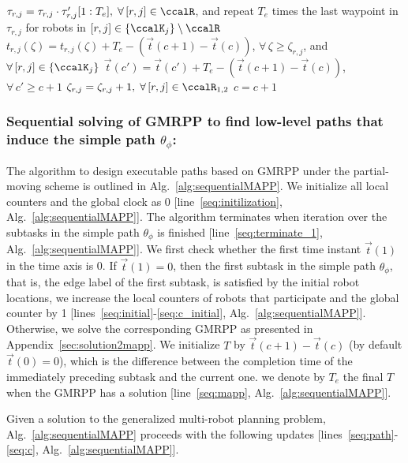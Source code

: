 \documentclass[Afour,sageh,times]{sagej}
\begin{document}
{{{\begin{algorithm}[!t]
{{            $\tau_{r,j} = \tau_{r,j} \cdot \tau'_{r,j}[1:T_e], \;\forall \,[r,j] \in \ccalR $, and repeat  $T_e$ times  the last waypoint in $\tau_{r,j}$ for robots in $[r,j] \in \{\ccalK_j\} \setminus \ccalR$ \label{seq:path}\;
            $t_{r,j}(\zeta) =  t_{r,j}(\zeta)  + T_e - (\vec{t}(c+1) - \vec{t}(c))$, $\forall \,\zeta \geq  \zeta_{r,j}$, and $ \forall\, [r,j] \in \{\ccalK_j\} $ \label{seq:timeline} \;
            $\vec{t}(c') = \vec{t}(c') + T_e - (\vec{t}(c+1) - \vec{t}(c))$, $ \forall \, c' \geq c+1$  \label{seq:axis}\;
            $\zeta_{r,j} = \zeta_{r,j} + 1, \; \forall \, [r,j] \in \ccalR_{1,2}$ \label{seq:counter}\;
            $c = c + 1$ \label{seq:c}\;

        }
      }
\end{algorithm}}

 \subsubsection{Sequential solving of  GMRPP to find low-level paths that induce the simple path $\theta_{\phi}$:}
 The algorithm to design executable paths based on GMRPP under the  partial-moving scheme is outlined in Alg.~\ref{alg:sequentialMAPP}.  We initialize all local counters and the global clock as 0 [line~\ref{seq:initilization}, Alg.~\ref{alg:sequentialMAPP}]. The algorithm  terminates when iteration over  the subtasks in the simple path $\theta_{\phi}$ is finished [line~\ref{seq:terminate_1}, Alg.~\ref{alg:sequentialMAPP}].  We first check whether the first time instant $\vec{t}(1)$ in the time axis is 0. If $\vec{t}(1)=0$, then the first subtask in the simple path $\theta_{\phi}$, that is, the edge label of the first subtask, is satisfied by the initial robot locations, we increase the local counters of robots that participate and the global counter by 1 [lines~\ref{seq:initial}-\ref{seq:c_initial}, Alg.~\ref{alg:sequentialMAPP}]. Otherwise, we solve the corresponding GMRPP as presented in Appendix~\ref{sec:solution2mapp}.  We initialize $T$ by $\vec{t}(c+1) - \vec{t}(c)$ (by default $\vec{t}(0)=0$),  which is the difference between the completion time of the immediately preceding subtask and the current one. %
we denote by $T_e$  the final $T$  when  the GMRPP has a solution [line~\ref{seq:mapp}, Alg.~\ref{alg:sequentialMAPP}]. {Given a solution to the generalized multi-robot planning problem, Alg.~\ref{alg:sequentialMAPP} proceeds with the following updates [lines~\ref{seq:path}-\ref{seq:c}, Alg.~\ref{alg:sequentialMAPP}].

}}}
\end{document}
